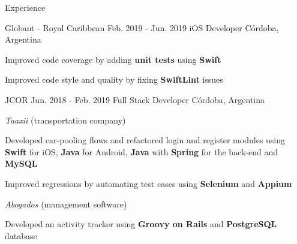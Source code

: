 \documentclass{curriculum}
\begin{document}
\begin{cvsection}{Experience}
\begin{sectionitemlist}
        \end{sectionitemlist}


    \makesectionitemheader
        {Globant - Royal Caribbean}                         {Feb. 2019 - Jun. 2019}
        {iOS Developer}                                         {Córdoba, Argentina}

        \begin{sectionitemlist}
        \item{Improved code coverage by adding \textbf{unit tests} using \textbf{Swift}}
        \item{Improved code style and quality by fixing \textbf{SwiftLint} issues}
        \end{sectionitemlist}


    \makesectionitemheader
        {JCOR}                                              {Jun. 2018 - Feb. 2019}
        {Full Stack Developer}                                 {Córdoba, Argentina}

        \begin{sectionitemlist}

        \item{\textit{Taaxii} (transportation company)}
            \begin{sectionitemlist}
            \item{
                Developed car-pooling flows and refactored login and register
                modules using \textbf{Swift} for iOS, \textbf{Java} for Android,
                \textbf{Java} with \textbf{Spring} for the back-end and \textbf{MySQL}
            }
            \item{
                Improved regressions by automating test cases
                using \textbf{Selenium} and \textbf{Appium}
            }
            \end{sectionitemlist}

        \item{\textit{Abogados} (management software)}
            \begin{sectionitemlist}
            \item{
                Developed an activity tracker using
                \textbf{Groovy on Rails} and \textbf{PostgreSQL} database
            }
            \end{sectionitemlist}


\end{sectionitemlist}
\end{cvsection}
\end{document}
